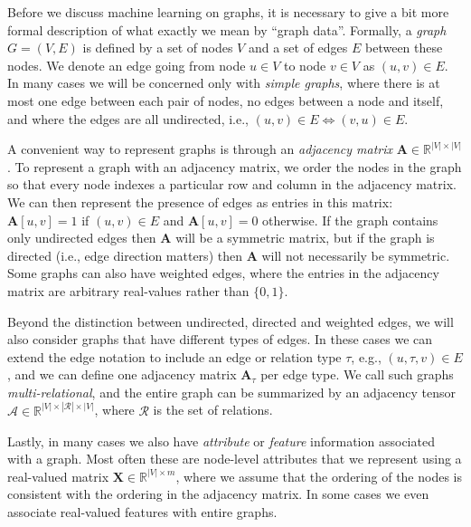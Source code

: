 \documentclass[10pt]{book}
\let\defaultmarginpar\marginpar
\renewcommand\marginpar[2][]{\defaultmarginpar{\itshape\color{gray}#2}}
\begin{document}
Before we discuss machine learning on graphs, it is necessary to give a bit more formal description of what exactly we mean by ``graph data''. Formally, a \emph{graph}\marginpar{graph} $G = (V, E)$ is defined by a set of nodes $V$ and a set of edges $E$ between these nodes. We denote an edge going from node $u \in V$ to node $v \in V$ as $(u, v) \in E$. In many cases we will be concerned only with \emph{simple graphs}, where there is at most one edge between each pair of nodes, no edges between a node and itself, and where the edges are all undirected, i.e., $(u, v) \in E \Longleftrightarrow (v, u) \in E$.

A convenient way to represent graphs is through an \emph{adjacency matrix}\marginpar{adjacency matrix} $\mathbf A \in \mathbb R^{|V| \times |V|}$. To represent a graph with an adjacency matrix, we order the nodes in the graph so that every node indexes a particular row and column in the adjacency matrix. We can then represent the presence of edges as entries in this matrix: $\mathbf A[u, v] = 1$ if $(u, v) \in E$ and $\mathbf A[u, v] = 0$ otherwise. If the graph contains only undirected edges then $\mathbf A$ will be a symmetric matrix, but if the graph is directed (i.e., edge direction matters) then $\mathbf A$ will not necessarily be symmetric. Some graphs can also have weighted edges, where the entries in the adjacency matrix are arbitrary real-values rather than $\{0, 1\}$.

Beyond the distinction between undirected, directed and weighted edges, we will also consider graphs that have different types of edges. In these cases we can extend the edge notation to include an edge or relation type $\tau$, e.g., $(u, \tau, v) \in E$, and we can define one adjacency matrix $\mathbf A_\tau$ per edge type. We call such graphs \emph{multi-relational}\marginpar{multi-relational graph}, and the entire graph can be summarized by an adjacency tensor $\mathcal A \in \mathbb R^{|V| \times |\mathcal R| \times |V|}$, where $\mathcal R$ is the set of relations.

Lastly, in many cases we also have \emph{attribute} or \emph{feature} information associated with a graph. Most often these are node-level attributes that we represent using a real-valued matrix $\mathbf X \in \mathbb R^{|V| \times m}$, where we assume that the ordering of the nodes is consistent with the ordering in the adjacency matrix. In some cases we even associate real-valued features with entire graphs.
\end{document}
